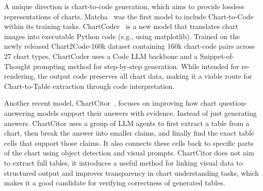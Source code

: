 \documentclass[
	letterpaper, %
]{jdf}
\begin{document}
A unique direction is chart-to-code generation, which aims to provide lossless representations of charts.
Matcha~\cite{liu2022matcha} was the first model to include Chart-to-Code within its training tasks.
ChartCoder~\cite{zhao2025chartcoder} is a new model that translates chart images into executable Python code (e.g., using matplotlib).
Trained on the newly released Chart2Code-160k dataset containing 160k chart-code pairs across 27 chart types, ChartCoder uses a Code LLM backbone and a Snippet-of-Thought prompting method for step-by-step generation.
While intended for re-rendering, the output code preserves all chart data, making it a viable route for Chart-to-Table extraction through code interpretation.

Another recent model, ChartCitor~\cite{goswami2025chartcitor}, focuses on improving how chart question-answering models support their answers with evidence. Instead of just generating answers.
ChartCitor uses a group of LLM agents to first extract a table from a chart, then break the answer into smaller claims, and finally find the exact table cells that support those claims.
It also connects these cells back to specific parts of the chart using object detection and visual prompts.
ChartCitor does not aim to extract full tables, it introduces a useful method for linking visual data to structured output and improves transparency in chart understanding tasks, which makes it a good candidate for verifying correctness of generated tables.
\end{document}
